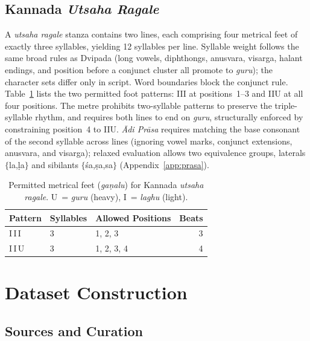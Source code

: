 \documentclass[11pt]{article}
\begin{document}
\subsection{Kannada \textit{Utsaha Ragale}}
\label{sec:utsaha_prosody}

A \textit{utsaha ragale} stanza contains two lines, each comprising
four metrical feet of exactly three syllables, yielding 12 syllables
per line. Syllable weight follows the same broad rules as Dvipada
(long vowels, diphthongs, anusvara, visarga, halant endings, and
position before a conjunct cluster all promote to \textit{guru}); the
character sets differ only in script. Word boundaries block the
conjunct rule. Table~\ref{tab:utsaha_ganas} lists the two permitted
foot patterns: III at positions~1--3 and IIU at all four positions.
The metre prohibits two-syllable patterns to preserve the triple-syllable
rhythm, and requires both lines to end on \textit{guru}, structurally
enforced by constraining position~4 to IIU. \textit{\={A}di
Pr\={a}sa} requires matching the base consonant of the second syllable
across lines (ignoring vowel marks, conjunct extensions, anusvara, and
visarga); relaxed evaluation allows two equivalence groups, laterals
$\{$la,\d{l}a$\}$ and sibilants $\{$\'{s}a,\d{s}a,sa$\}$
(Appendix~\ref{app:prasa}).

\begin{table}[h]
\centering
\small
\caption{Permitted metrical feet (\textit{ga\d{n}alu}) for Kannada
\textit{utsaha ragale}. U~= \textit{guru} (heavy), I~= \textit{laghu} (light).}
\label{tab:utsaha_ganas}
\begin{tabular}{lllr}
\toprule
\textbf{Pattern} & \textbf{Syllables} & \textbf{Allowed Positions} & \textbf{Beats} \\
\midrule
I\,I\,I & 3 & 1, 2, 3    & 3 \\
I\,I\,U & 3 & 1, 2, 3, 4 & 4 \\
\bottomrule
\end{tabular}
\end{table}

\section{Dataset Construction}
\label{sec:dataset}

\subsection{Sources and Curation}
\end{document}
